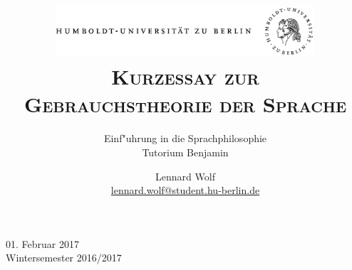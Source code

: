 \documentclass[a4paper, emulatestandardclasses, 12pt]{scrartcl}
\date{\vspace{-3ex}}
\begin{document}
\title{\vspace{5ex}
	\includegraphics*[width=0.72\textwidth]{images/hu_logo.png}\\
	\vspace{30pt}
	\scshape\LARGE{Kurzessay zur\\Gebrauchstheorie der Sprache}}
	
	\subtitle{\vspace{20pt}Einf"uhrung in die Sprachphilosophie\\
          \vspace{6pt}
          Tutorium Benjamin\\}


\author{\vspace{-4pt}Lennard Wolf\\
        \small{\href{mailto:lennard.wolf@student.hu-berlin.de}{lennard.wolf@student.hu-berlin.de}}}      

\maketitle

\vspace{\fill}

\begin{minipage}[b]{\textwidth}
    \centering
    \onehalfspacing
    \large   
    01. Februar 2017\\
    Wintersemester 2016/2017

    \vspace{-20mm} 
\end{minipage}%
\thispagestyle{empty}
\newpage
\clearpage
\setcounter{page}{1}
\end{document}
